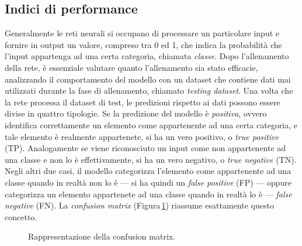 \subsection{Indici di performance}
% 
Generalmente le reti neurali si occupano di processare un particolare input e fornire in output un valore, compreso tra 0 ed 1, che indica la probabilità che l'input appartenga ad una certa categoria, chiamata \textsl{classe}. Dopo l'allenamento della rete, è essenziale valutare quanto l'allenamento sia stato efficacie, analizzando il comportamento del modello con un dataset che contiene dati mai utilizzati durante la fase di allenamento, chiamato \textit{testing dataset}. Una volta che la rete processa il dataset di test, le predizioni rispetto ai dati possono essere divise in quattro tipologie. Se la predizione del modello è \textsl{positiva}, ovvero identifica correttamente un elemento come appartenente ad una certa categoria, e tale elemento è realmente appartenete, si ha un vero positivo, o \textit{true positive} (TP). Analogamente se viene riconosciuto un input come non appartenente ad una classe e non lo è effettivamente, si ha un vero negativo, o \textit{true negative} (TN). Negli altri due casi, il modello categorizza l'elemento come appartenente ad una classe quando in realtà non lo è — si ha quindi un \textit{false positive} (FP) — oppure categorizza un elemento appartenete ad una classe quando in realtà lo è — \textit{false negative} (FN). La \textit{confusion matrix} (Figura\,\ref{fig:confusion-matrix}) riassume esattamente questo concetto.
% 
\begin{figure}[!t]
    \centering
    
    \caption[Rappresentazione della confusion matrix.]{Rappresentazione della confusion matrix.}\label{fig:confusion-matrix}
\end{figure}
% 

